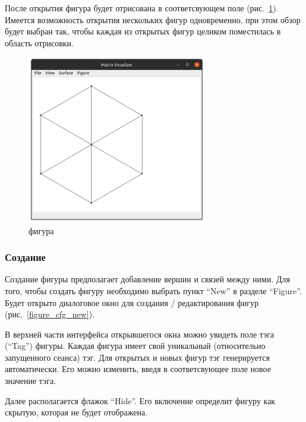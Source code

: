 \documentclass[12pt, a4paper, hidelinks]{article}
\begin{document}
После открытия фигура будет отрисована в соответсвующем поле (рис.~\ref{figure}). Имеется возможность открытия нескольких фигур одновременно, при этом обзор будет выбран так, чтобы каждая из открытых фигур целиком поместилась в область отрисовки. 
\begin{figure}[htbp!]
	\centering
	\includegraphics[width=0.7\textwidth]{images/figureopened.png}
	\caption{фигура}
	\label{figure}
\end{figure}

\subsubsection{Создание}
Создание фигуры предполагает добавление вершин и связей между ними. Для того, чтобы создать фигуру необходимо выбрать пункт \enquote{New} в разделе \enquote{Figure}. Будет открыто диалоговое окно для создания / редактирования фигур (рис.~\ref{figure_cfg_new}).

В верхней части интерфейса открывшегося окна можно увидеть поле тэга (\enquote{Tag}) фигуры. Каждая фигура имеет свой уникальный (относительно запущенного сеанса) тэг. Для открытых и новых фигур тэг генерируется автоматически. Его можно изменить, введя в соответсвующее поле новое значение тэга.

Далее располагается флажок \enquote{Hide}. Его включение определит фигуру как скрытую, которая не будет отображена.
\end{document}
